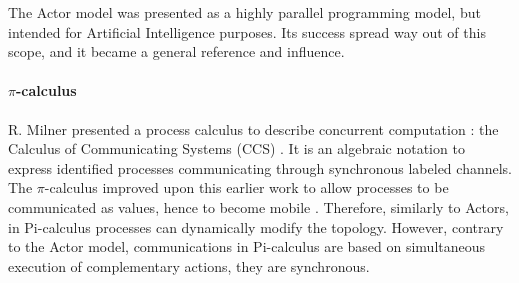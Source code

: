 The Actor model was presented as a highly parallel programming model, but intended for Artificial Intelligence purposes.
Its success spread way out of this scope, and it became a general reference and influence.


\paragraph{$\pi$-calculus}

R. Milner presented a process calculus to describe concurrent computation : the Calculus of Communicating Systems (CCS) \cite{Milner1975, Milner1980}.
It is an algebraic notation to express identified processes communicating through synchronous labeled channels.
The $\pi$-calculus improved upon this earlier work to allow processes to be communicated as values, hence to become mobile \cite{Engberg1986,Milner1992a,Milner1992}.
Therefore, similarly to Actors, in Pi-calculus processes can dynamically modify the topology.
However, contrary to the Actor model, communications in Pi-calculus are based on simultaneous execution of complementary actions, they are synchronous.












